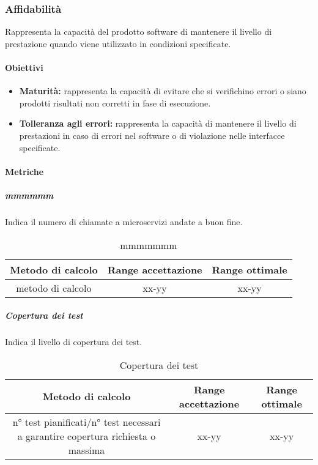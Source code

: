 	\subsubsection{Affidabilità}
	Rappresenta la capacità del prodotto software di mantenere il livello di prestazione quando viene utilizzato in condizioni specificate.
		
		\paragraph{Obiettivi}
			\begin{itemize}
				\item \textbf{Maturità:} rappresenta la capacità di evitare che si verifichino errori o siano prodotti risultati non corretti in fase di esecuzione.
				\item \textbf{Tolleranza agli errori:} rappresenta la capacità di mantenere il livello di prestazioni in caso di errori nel software o di violazione nelle interfacce specificate.
			\end{itemize}
		
		\paragraph{Metriche}
			\subparagraph{mmmmmm}
			Indica il numero di chiamate a microservizi andate a buon fine.
			\begin{table}[H]
				\begin{center}
					\begin{tabular}{|c|c|c|}
						\hline
						\textbf{Metodo di calcolo} & \textbf{Range accettazione} & \textbf{Range ottimale} \\
						\hline
						metodo di calcolo & xx-yy  & xx-yy \\
						\hline
					\end{tabular}
				\end{center}
				\caption{mmmmmmm}
			\end{table}
		
			\subparagraph{Copertura dei test}
			Indica il livello di copertura dei test.
			\begin{table}[H]
				\begin{center}
					\begin{tabular}{|c|c|c|}
						\hline
						\textbf{Metodo di calcolo} & \textbf{Range accettazione} & \textbf{Range ottimale} \\
						\hline
						n° test pianificati/n° test necessari a garantire copertura richiesta o massima & xx-yy  & xx-yy \\
						\hline
					\end{tabular}
				\end{center}
				\caption{Copertura dei test}
			\end{table}
			
